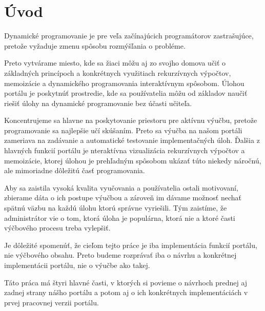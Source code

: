 \chapter*{Úvod}
Dynamické programovanie je pre veľa začínajúcich programátorov zastrašujúce,
pretože vyžaduje zmenu spôsobu rozmýšľania o probléme.

Preto vytvárame miesto, kde sa žiaci môžu aj zo svojho domova učiť o základných princípoch a
konkrétnych využitiach rekurzívnych výpočtov, memoizácie a dynamického programovania interaktívnym spôsobom.
Úlohou portálu je poskytnúť prostredie, kde sa používatelia môžu od základov naučiť
riešiť úlohy na dynamické programovanie bez účasti učiteľa.

Koncentrujeme sa hlavne na poskytovanie priestoru pre aktívnu výučbu,
pretože programovanie sa najlepšie učí skúšaním. Preto sa výučba na našom portáli zameriava na
zadávanie a automatické testovanie implementačných úloh. Ďalšia z hlavných funkcií portálu je
nteraktívna vizualizácia rekurzívnych výpočtov a memoizácie, ktorej úlohou je prehľadným spôsobom ukázať túto niekedy
náročnú, ale mimoriadne dôležitú časť programovania.

Aby sa zaistila vysoká kvalita vyučovania a používatelia ostali motivovaní, zbierame
dáta o ich postupe výučbou a zároveň im dávame možnosť nechať spätnú väzbu na
každú úlohu ktorú správne vyriešili. Tým zaistíme, že administrátor vie o tom,
ktorá úloha je populárna, ktorá nie a ktoré časti výčbového procesu treba vylepšiť.

Je dôležité spomenúť, že cieľom tejto práce je iba implementácia funkcií portálu, nie výčbového
obsahu. Preto budeme rozprávať iba o návrhu a konkrétnej implementácii portálu,
nie o výučbe ako takej.

Táto práca má štyri hlavné časti, v ktorých si povieme o návrhoch prednej
aj zadnej strany nášho portálu a potom aj o ich konkrétnych implementáciách v prvej pracovnej
verzii portálu.
